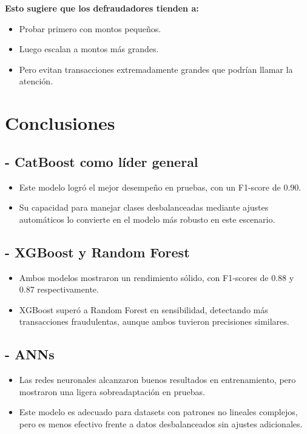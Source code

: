 \documentclass[9pt,a4paper,twoside]{rho-class/rho}
\begin{document}
        \textbf{Esto sugiere que los defraudadores tienden a:}
        \begin{itemize}
        \item Probar primero con montos pequeños.
        \item Luego escalan a montos más grandes.
        \item Pero evitan transacciones extremadamente grandes que podrían llamar la atención.
        \end{itemize}
        
    \section{Conclusiones}

    \subsection*{- CatBoost como líder general}
        \begin{itemize}
        \item Este modelo logró el mejor desempeño en pruebas, con un F1-score de 0.90.
        \item Su capacidad para manejar clases desbalanceadas mediante ajustes automáticos lo convierte en el modelo más robusto en este escenario.
        \end{itemize}
        
        \subsection*{- XGBoost y Random Forest}
        \begin{itemize}
        \item Ambos modelos mostraron un rendimiento sólido, con F1-scores de 0.88 y 0.87 respectivamente.
        \item XGBoost superó a Random Forest en sensibilidad, detectando más transacciones fraudulentas, aunque ambos tuvieron precisiones similares.
        \end{itemize}
        
        \subsection*{- ANNs}
        \begin{itemize}
        \item Las redes neuronales alcanzaron buenos resultados en entrenamiento, pero mostraron una ligera sobreadaptación en pruebas.
        \item Este modelo es adecuado para datasets con patrones no lineales complejos, pero es menos efectivo frente a datos desbalanceados sin ajustes adicionales.
        \end{itemize}
        
\end{document}
